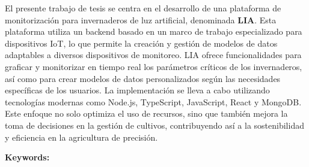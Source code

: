 \large{El presente trabajo de tesis se centra en el desarrollo de una plataforma de monitorización para invernaderos de luz artificial, denominada \textbf{LIA}. Esta plataforma utiliza un backend basado en un marco de trabajo especializado para dispositivos IoT, lo que permite la creación y gestión de modelos de datos adaptables a diversos dispositivos de monitoreo. LIA ofrece funcionalidades para graficar y monitorizar en tiempo real los parámetros críticos de los invernaderos, así como para crear modelos de datos personalizados según las necesidades específicas de los usuarios. La implementación se lleva a cabo utilizando tecnologías modernas como Node.js, TypeScript, JavaScript, React y MongoDB. Este enfoque no solo optimiza el uso de recursos, sino que también mejora la toma de decisiones en la gestión de cultivos, contribuyendo así a la sostenibilidad y eficiencia en la agricultura de precisión.}


\makeatletter
\textbf{Keywords:} \@keywords
\makeatother